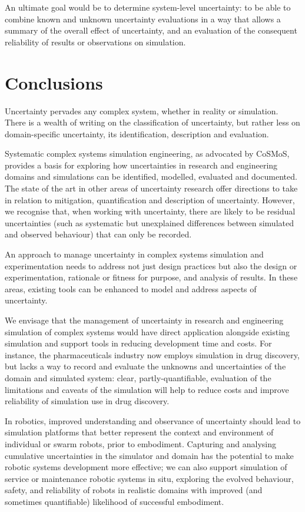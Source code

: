 \documentclass[sigconf,authordraft]{acmart}
\begin{document}
An ultimate goal would be to determine system-level uncertainty: to be able to combine known and unknown uncertainty evaluations in a way that allows a summary of the overall effect of uncertainty, and an evaluation of the consequent reliability of results or observations on simulation. 

\section{Conclusions}

Uncertainty pervades any complex system, whether in reality or simulation.  There is a wealth of writing on the classification of uncertainty, but rather less on domain-specific uncertainty, its identification, description and evaluation.

Systematic complex systems simulation engineering, as advocated by CoSMoS, provides a basis for exploring how uncertainties in research and engineering domains and simulations can be identified, modelled, evaluated and documented.  The state of the art in other areas of uncertainty research offer directions to take in relation to mitigation, quantification and description of uncertainty.  However, we recognise that, when working with uncertainty, there are likely to be residual uncertainties (such as systematic but unexplained differences between simulated and observed behaviour) that can only be recorded.

An approach to manage uncertainty in complex systems simulation and experimentation needs to address not just design practices but also the design or experimentation, rationale or fitness for purpose, and analysis of results.  In these areas, existing tools can be enhanced to model and address aspects of uncertainty.

We envisage that the management of uncertainty in research and engineering simulation of complex systems would have direct application alongside existing simulation and support tools in reducing    development time and costs.  For instance, the pharmaceuticals industry now employs simulation in drug discovery, but lacks a way to record and evaluate the unknowns and uncertainties of the domain and simulated system: clear, partly-quantifiable, evaluation of the limitations and caveats of the simulation will help to reduce costs and improve reliability of simulation use in drug discovery.

In robotics, improved understanding and observance of uncertainty should lead to  simulation platforms that better represent the context and environment of individual or swarm robots, prior to embodiment.  Capturing and analysing cumulative uncertainties in the simulator and domain has the potential to make robotic systems development more effective; we can also support simulation of service or maintenance robotic systems in situ, exploring the evolved behaviour, safety, and reliability of robots in realistic domains with improved (and sometimes quantifiable) likelihood of successful embodiment.

  
  
\end{document}
